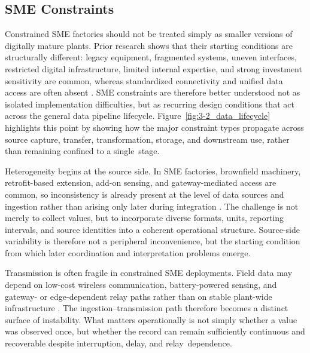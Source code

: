 \documentclass[systems,article,accept,pdftex,moreauthors]{Definitions/mdpi}
\begin{document}
\subsection{SME Constraints}
\label{sec:sme_constraints}


Constrained SME factories should not be treated simply as smaller versions of digitally mature plants. Prior research shows that their starting conditions are structurally different: legacy equipment, fragmented systems, uneven interfaces, restricted digital infrastructure, limited internal expertise, and strong investment sensitivity are common, whereas standardized connectivity and unified data access are often absent \cite{mittal2018maturity, mittal2020adoption, ghobakhloo2019adoption, krishnan2024challenges, rauch2019requirements}. SME constraints are therefore better understood not as isolated implementation difficulties, but as recurring design conditions that act across the general data pipeline lifecycle. Figure~\ref{fig:3-2_data_lifecycle} highlights this point by showing how the major constraint types propagate across source capture, transfer, transformation, storage, and downstream use, rather than remaining confined to a \mbox{single stage}.

Heterogeneity begins at the source side. In SME factories, brownfield machinery, retrofit-based extension, add-on sensing, and gateway-mediated access are common, so inconsistency is already present at the level of data sources and ingestion rather than arising only later during integration \cite{alqoud2022legacy, etz2020retrofit, tran2022retrofitting, park2019opcua}. The challenge is not merely to collect values, but to incorporate diverse formats, units, reporting intervals, and source identities into a coherent operational structure. Source-side variability is therefore not a peripheral inconvenience, but the starting condition from which later coordination and interpretation problems emerge.

Transmission is often fragile in constrained SME deployments. Field data may depend on low-cost wireless communication, battery-powered sensing, and gateway- or edge-dependent relay paths rather than on stable plant-wide infrastructure \cite{gao2019connectivity, noor2023wireless, hawkridge2019tying}. The ingestion--transmission path therefore becomes a distinct surface of instability. What matters operationally is not simply whether a value was observed once, but whether the record can remain sufficiently continuous and recoverable despite interruption, delay, and \mbox{relay dependence}.
\end{document}
